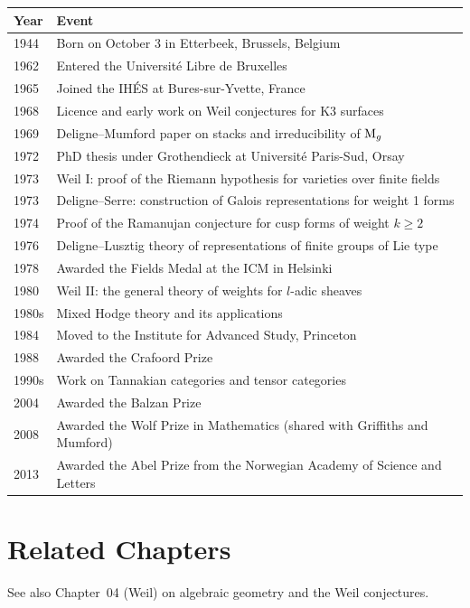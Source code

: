 \begin{tabularx}{\linewidth}{|p{1.5cm}|>{\raggedright\arraybackslash}X|}
\hline
\textbf{Year} & \textbf{Event} \\ \hline
1944 & Born on October 3 in Etterbeek, Brussels, Belgium \\ \hline
1962 & Entered the Universit\'e Libre de Bruxelles \\ \hline
1965 & Joined the IH\'ES at Bures-sur-Yvette, France \\ \hline
1968 & Licence and early work on Weil conjectures for K3 surfaces \\ \hline
1969 & Deligne--Mumford paper on stacks and irreducibility of \(\operatorname{M}_g\) \\ \hline
1972 & PhD thesis under Grothendieck at Universit\'e Paris-Sud, Orsay \\ \hline
1973 & Weil I: proof of the Riemann hypothesis for varieties over finite fields \\ \hline
1973 & Deligne--Serre: construction of Galois representations for weight 1 forms \\ \hline
1974 & Proof of the Ramanujan conjecture for cusp forms of weight \(k \geq 2\) \\ \hline
1976 & Deligne--Lusztig theory of representations of finite groups of Lie type \\ \hline
1978 & Awarded the Fields Medal at the ICM in Helsinki \\ \hline
1980 & Weil II: the general theory of weights for \(l\)-adic sheaves \\ \hline
1980s & Mixed Hodge theory and its applications \\ \hline
1984 & Moved to the Institute for Advanced Study, Princeton \\ \hline
1988 & Awarded the Crafoord Prize \\ \hline
1990s & Work on Tannakian categories and tensor categories \\ \hline
2004 & Awarded the Balzan Prize \\ \hline
2008 & Awarded the Wolf Prize in Mathematics (shared with Griffiths and Mumford) \\ \hline
2013 & Awarded the Abel Prize from the Norwegian Academy of Science and Letters \\ \hline
\end{tabularx}

\section{Related Chapters}
See also Chapter~04 (Weil) on algebraic geometry and the Weil conjectures.


